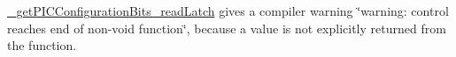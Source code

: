 
\begin{DoxyRefList}
\item[\label{bug__bug000001}%
\hypertarget{bug__bug000001}{}%
File \hyperlink{get_p_i_c_configuration_bits_8h}{get\+P\+I\+C\+Configuration\+Bits.h} ]\hyperlink{get_p_i_c_configuration_bits_8c_ae200dc6306b6e0b8a239633100921d3c}{\+\_\+get\+P\+I\+C\+Configuration\+Bits\+\_\+read\+Latch} gives a compiler warning \char`\"{}warning\+: control reaches end of non-\/void function\char`\"{}, because a value is not explicitly returned from the function.
\end{DoxyRefList}